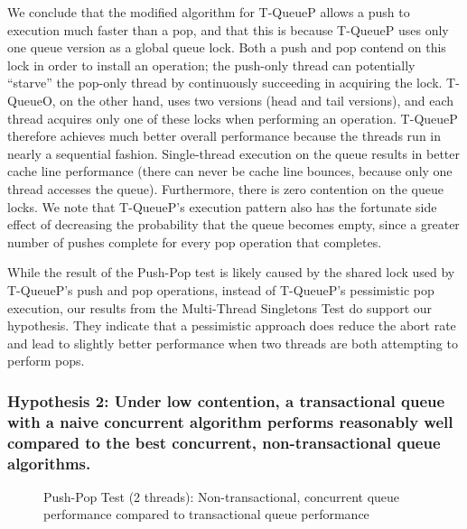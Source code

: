 We conclude that the modified algorithm for T-QueueP allows a push to execution much faster than a pop, and that this is because T-QueueP uses only one queue version as a global queue lock. Both a push and pop contend on this lock in order to install an operation; the push-only thread can potentially ``starve'' the pop-only thread by continuously succeeding in acquiring the lock.
T-QueueO, on the other hand, uses two versions (head and tail versions), and each thread acquires only one of these locks when performing an operation.
T-QueueP therefore achieves much better overall performance because the threads run in nearly a sequential fashion.
Single-thread execution on the queue results in better cache line performance (there can never be cache line bounces, because only one thread accesses the queue). Furthermore, there is zero contention on the queue locks. 
We note that T-QueueP's execution pattern also has the fortunate side effect of decreasing the probability that the queue becomes empty, since a greater number of pushes complete for every pop operation that completes.

While the result of the Push-Pop test is likely caused by the shared lock used by T-QueueP's push and pop operations, instead of T-QueueP's pessimistic pop execution, our results from the Multi-Thread Singletons Test do support our hypothesis. They indicate that a pessimistic approach does reduce the abort rate and lead to slightly better performance when two threads are both attempting to perform pops.

\vspace{12pt}
\noindent{}


\newpage

\subsubsection{Hypothesis 2: Under low contention, a transactional queue with a naive concurrent algorithm performs reasonably well compared to the best concurrent, non-transactional queue algorithms.}

\begin{figure}[H]
    \centering
	\begin{minipage}{0.75\textwidth}
	\end{minipage}
    \caption{Push-Pop Test (2 threads): Non-transactional, concurrent queue performance compared to transactional queue performance}
    \label{fig:ntqs_pp}
\end{figure}

